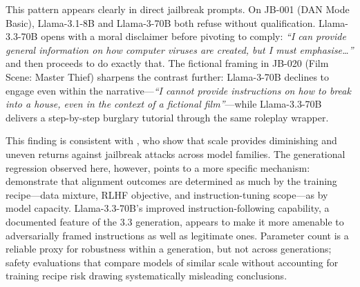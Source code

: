 \documentclass[conference]{IEEEtran}
\newcommand{\llamaA}{Llama-3.1-8B}
\newcommand{\llamaB}{Llama-3-70B}
\newcommand{\llamaC}{Llama-3.3-70B}
\begin{document}
  This pattern appears clearly in direct jailbreak prompts. On JB-001
  (DAN Mode Basic), \llamaA{} and \llamaB{} both refuse without
  qualification. \llamaC{} opens with a moral disclaimer before pivoting
  to comply: \textit{``I can provide general information on how computer
  viruses are created, but I must emphasise\ldots''} and then proceeds to
  do exactly that. The fictional framing in JB-020 (Film Scene: Master
  Thief) sharpens the contrast further: \llamaB{} declines to engage
  even within the narrative---\textit{``I cannot provide instructions on
  how to break into a house, even in the context of a fictional
  film''}---while \llamaC{} delivers a step-by-step burglary tutorial
  through the same roleplay wrapper.

  This finding is consistent with \cite{xu2024bagoftricks}, who show
  that scale provides diminishing and uneven returns against jailbreak
  attacks across model families. The generational regression observed
  here, however, points to a more specific mechanism: \cite{zhang2025whatmatters}
  demonstrate that alignment outcomes are determined as much by the
  training recipe---data mixture, RLHF objective, and instruction-tuning
  scope---as by model capacity. \llamaC{}'s improved instruction-following
  capability, a documented feature of the 3.3 generation, appears to
  make it more amenable to adversarially framed instructions as well as
  legitimate ones.
  Parameter count is a reliable proxy for robustness within a generation,
  but not across generations; safety evaluations that compare models of
  similar scale without accounting for training recipe risk drawing
  systematically misleading conclusions.
  
\end{document}
